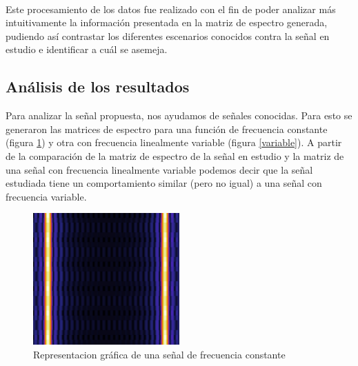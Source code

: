 \documentclass{article}
\begin{document}
	        \paragraph{}

	        \paragraph{}
	        Este procesamiento de los datos fue realizado con el fin de poder analizar más intuitivamente la información presentada en la matriz de espectro generada, 
	        pudiendo así contrastar los diferentes escenarios conocidos contra la señal en estudio e identificar a cuál se asemeja.
	        
	\subsection{Análisis de los resultados}
	        
	        Para analizar la señal propuesta, nos ayudamos de señales conocidas. Para esto se generaron las matrices de espectro para una función de frecuencia constante (figura \ref{constante}) y otra con frecuencia linealmente variable (figura \ref{variable}).
	        A partir de la comparación de la matriz de espectro de la señal en estudio y la matriz de una señal con frecuencia linealmente variable podemos decir que la señal estudiada tiene un comportamiento similar (pero no igual) a una señal con frecuencia variable.
	        
	
	        \begin{figure}[h!]
	            \centering
	            \includegraphics[width=0.5\textwidth]{./Imagenes/Espectrogramas/constante.jpg}
	            \caption{Representacion gráfica de una señal de frecuencia constante}
	            \label{constante}
	        \end{figure}
	
\end{document}
